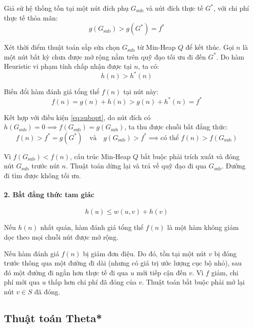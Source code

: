 \documentclass[a4paper, 12pt]{report}
\begin{document}
      
      \noindent Giả sử hệ thống tồn tại một nút đích phụ $G_{\text{sub}}$ và nút đích thực tế $G^*$, với chi phí thực tế thỏa mãn:
  \begin{equation}\label{eq:subopt}
  g(G_{\text{sub}}) > g(G^*) = f^*
  \end{equation}

  Xét thời điểm thuật toán sắp sửa chọn $G_{\text{sub}}$ từ Min-Heap $Q$ để kết thúc. Gọi $n$ là một nút bất kỳ chưa được mở rộng nằm trên quỹ đạo tối ưu đi đến $G^*$. Do hàm Heuristic vi phạm tính chấp nhận được tại $n$, ta có:
  $$h(n) > h^*(n)$$

  Biến đổi hàm đánh giá tổng thể $f(n)$ tại nút này:
  \begin{equation}
  f(n) = g(n) + h(n) > g(n) + h^*(n) = f^*
  \end{equation}

  Kết hợp với điều kiện \eqref{eq:subopt}, do nút đích có $h(G_{\text{sub}}) = 0 \implies f(G_{\text{sub}}) = g(G_{\text{sub}})$, ta thu được chuỗi bất đẳng thức:
  \begin{equation}
  f(n) > f^* = g(G^*) \quad \text{và} \quad g(G_{\text{sub}}) > f^* \implies \text{có thể } f(n) > f(G_{\text{sub}})
  \end{equation}

  Vì $f(G_{\text{sub}}) < f(n)$, cấu trúc Min-Heap $Q$ bắt buộc phải trích xuất và đóng nút $G_{\text{sub}}$ trước nút $n$. Thuật toán dừng lại và trả về quỹ đạo đi qua $G_{\text{sub}}$. Đường đi tìm được không tối ưu.

  \paragraph{2. Bất đẳng thức tam giác}
      \begin{equation}\label{eq:consistency}
      h(u) \leq w(u, v) + h(v)
      \end{equation}
      
      Nếu $h(n)$ nhất quán, hàm đánh giá tổng thể $f(n)$ là một hàm không giảm dọc theo mọi chuỗi nút được mở rộng.

      Nếu hàm đánh giá $f(n)$ bị giảm đơn điệu. Do đó, tồn tại một nút $v$ bị đóng trước thông qua một đường đi dài (nhưng có giá trị ước lượng cục bộ nhỏ), sau đó một đường đi ngắn hơn thực tế đi qua $u$ mới tiếp cận đến $v$. Vì $f$ giảm, chi phí mới qua $u$ thấp hơn chi phí đã đóng của $v$. Thuật toán bắt buộc phải mở lại nút $v \in S$ đã đóng.


  \subsection{Thuật toán Theta*}
\end{document}
